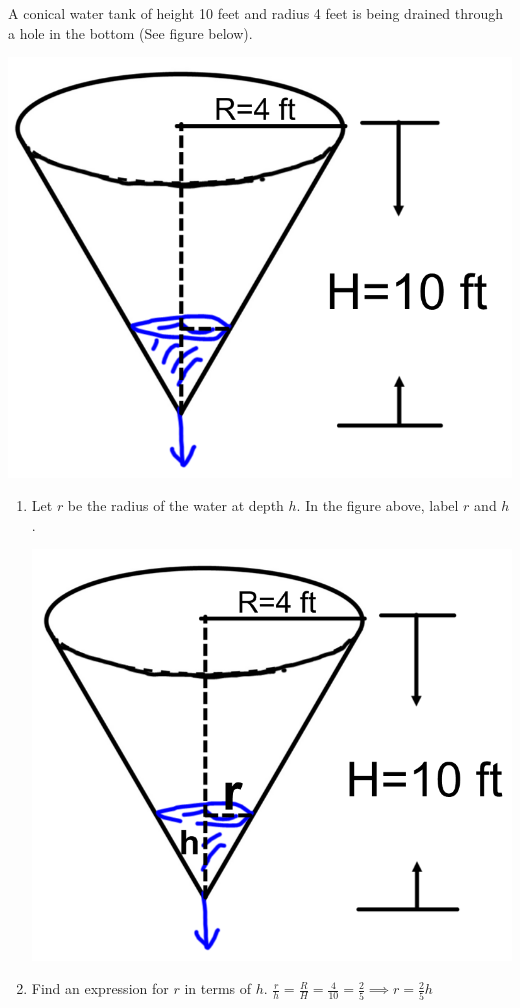 \documentclass[nooutcomes]{ximera}
\begin{document}
\begin{problem}
A conical water tank of height 10 feet and radius 4 feet is being drained through a hole in the bottom (See figure below).   
		\begin{image}
		\includegraphics[scale=.4]{Figure14.png}
		\end{image}

\begin{enumerate}
	\item Let $r$ be the radius of the water at depth $h$.  In the figure above, label $r$ and $h$.
		\begin{freeResponse} \hfil
		\begin{image}
		\includegraphics[scale=.3]{Figure15.png}
		\end{image}
		\end{freeResponse}	
	\item Find an expression for $r$ in terms of $h$.
	$\frac{r}{h}=\frac{R}{H}=\frac{4}{10}=\frac{2}{5} \implies r=\frac{2}{5}h$
	

\end{enumerate}
\end{problem}
\end{document}
